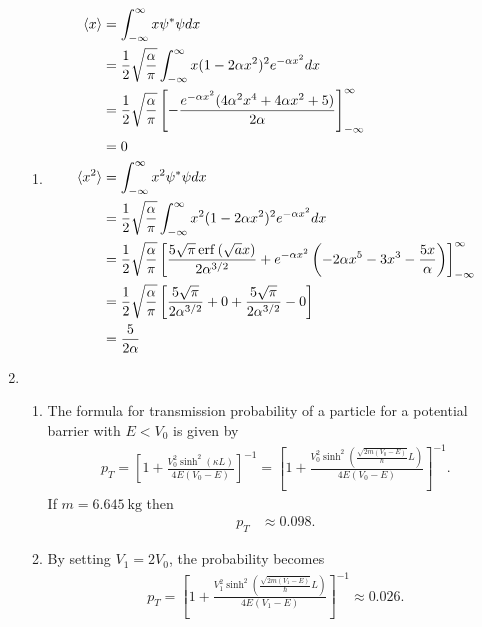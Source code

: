 \documentclass[a4paper,12pt]{article}
\begin{document}
\begin{enumerate}
\begin{enumerate}
            \item
                \begin{align*}
                    \langle x \rangle &= \int_{-\infty}^\infty x \psi^* \psi dx \\
                    &= \frac{1}{2} \sqrt{\frac{\alpha}{\pi}} \int_{-\infty}^\infty x (1 - 2\alpha x^2)^2 e^{-\alpha x^2} dx \\
                    &= \frac{1}{2} \sqrt{\frac{\alpha}{\pi}} \left[ -\frac{e^{-\alpha x^2} (4 \alpha^2 x^4 + 4 \alpha x^2 + 5)}{2 \alpha} \right]_{-\infty}^\infty \\
                    &= 0 \\
                    \langle x^2 \rangle &= \int_{-\infty}^\infty x^2 \psi^* \psi dx \\
                    &= \frac{1}{2} \sqrt{\frac{\alpha}{\pi}} \int_{-\infty}^\infty x^2 (1 - 2\alpha x^2)^2 e^{-\alpha x^2} dx \\
                    &= \frac{1}{2} \sqrt{\frac{\alpha}{\pi}} \left[ \frac{5 \sqrt{\pi} \erf\left( \sqrt{a} x \right)}{2 \alpha^{3/2}} + e^{-\alpha x^2} \left( -2 \alpha x^5 - 3x^3 - \frac{5x}{\alpha} \right) \right]_{-\infty}^\infty \\
                    &= \frac{1}{2} \sqrt{\frac{\alpha}{\pi}} \left[ \frac{5 \sqrt{\pi}}{2 \alpha^{3/2}} + 0 + \frac{5 \sqrt{\pi}}{2 \alpha^{3/2}} - 0 \right] \\
                    &= \frac{5}{2 \alpha}
                \end{align*}
        \end{enumerate}

    \item
        \begin{enumerate}
            \item
                The formula for transmission probability of a particle for a potential barrier with $E < V_0$ is given by
                \begin{align*}
                    p_T = \left[ 1 + \frac{V_0^2 \sinh^2(\kappa L)}{4E(V_0 - E)} \right]^{-1} = \left[ 1 + \frac{V_0^2 \sinh^2(\frac{\sqrt{2m(V_0 - E)}}{\hbar} L)}{4E(V_0 - E)} \right]^{-1}.
                \end{align*}
                If $m = \SI{6.645}{\kg}$ then
                \begin{align*}
                    p_T &\approx 0.098.
                \end{align*}

            \item
                By setting $V_1 = 2V_0$, the probability becomes
                \begin{align*}
                    p_T = \left[ 1 + \frac{V_1^2 \sinh^2(\frac{\sqrt{2m(V_1 - E)}}{\hbar} L)}{4E(V_1 - E)} \right]^{-1} \approx 0.026.
                \end{align*}
                

\end{enumerate}
\end{enumerate}
\end{document}

